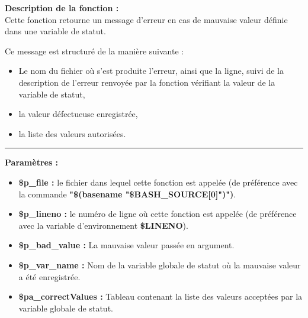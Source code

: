 \documentclass[a4paper,10pt]{article}
\begin{document}
\begin{justify}
\textbf{Description de la fonction :}\\[1\baselineskip]
    Cette fonction retourne un message d'erreur en cas de mauvaise valeur définie dans une variable de statut.
\end{justify}

\begin{justify}
   	Ce message est structuré de la manière suivante :

   	\begin{itemize}
   		\item Le nom du fichier où s'est produite l'erreur, ainsi que la ligne, suivi de la description de l'erreur renvoyée par la fonction vérifiant la valeur de la variable de statut,\setlength{\parskip}{1em}

   		\item la valeur défectueuse enregistrée,

   		\item la liste des valeurs autorisées.
   	\end{itemize}
\end{justify}


\par\noindent\rule{\textwidth}{0.4pt}

\begin{justify}
    \textbf{Paramètres :}
    \begin{itemize}
        \item \textbf{\color{vars}\$p\_file\color{text} :} le fichier dans lequel cette fonction est appelée (de préférence avec la commande \textbf{\textbf{"\$(\color{gray}basename \color{text}"\color{vars}\$BASH\_SOURCE[0]\color{text}")")}}.\setlength{\parskip}{1em}

        \item \textbf{\color{vars}\$p\_lineno\color{text} :} le numéro de ligne où cette fonction est appelée (de préférence avec la variable d'environnement \textbf{\color{vars}\$LINENO}).

        \item \textbf{\color{vars}\$p\_bad\_value\color{text} :} La mauvaise valeur passée en argument\color{text}.

        \item \textbf{\color{vars}\$p\_var\_name\color{text} :}  Nom de la variable globale de statut où la mauvaise valeur a été enregistrée.\color{text}

        \item \textbf{\color{vars}\$pa\_correctValues\color{text} :} Tableau contenant la liste des valeurs acceptées par la variable globale de statut.
    \end{itemize}
\end{justify}\setlength{\parskip}{2em}
\end{document}
